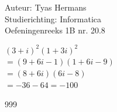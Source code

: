 \documentclass[a4paper]{article}
\begin{document}
  
\noindent \large Auteur: Tyas Hermans \\
\noindent \large Studierichting: Informatica\\
\noindent \large Oefeningenreeks 1B nr. 20.8\\

\medskip

\normalsize

$ (3+i)^2(1+3i)^2$\\

$ = (9+6i-1)(1+6i-9)$\\

$ = (8+6i)(6i-8) $\\

$ = -36 -64 = -100$\\

\begin{thebibliography}{999}
\end{thebibliography}
\end{document}

